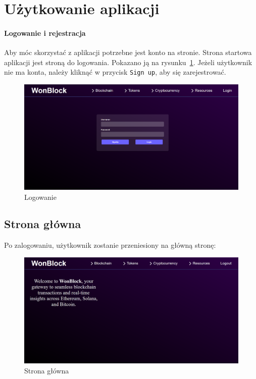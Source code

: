 \section{Użytkowanie aplikacji}
\paragraph{Logowanie i rejestracja}
Aby móc skorzystać z aplikacji potrzebne jest konto na stronie. Strona startowa aplikacji jest stroną do logowania. Pokazano ją na rysunku~\ref{fig:Logowanie}.
Jeżeli użytkownik nie ma konta, należy kliknąć w przycisk \texttt{Sign up}, aby się zarejestrować. 
\begin{figure}[htb]
    \centering
    \includegraphics[width=0.8\linewidth]{./instrukcja/Login.png}
    \caption{Logowanie}
    \label{fig:Logowanie}
\end{figure}

\subsection{Strona główna}
Po zalogowaniu, użytkownik zostanie przeniesiony na główną stronę:
\begin{figure}[htb]
    \centering
    \includegraphics[width=0.8\linewidth]{./instrukcja/mainpage.png}
    \caption{Strona główna}
    \label{fig:Strona główna}
\end{figure}

